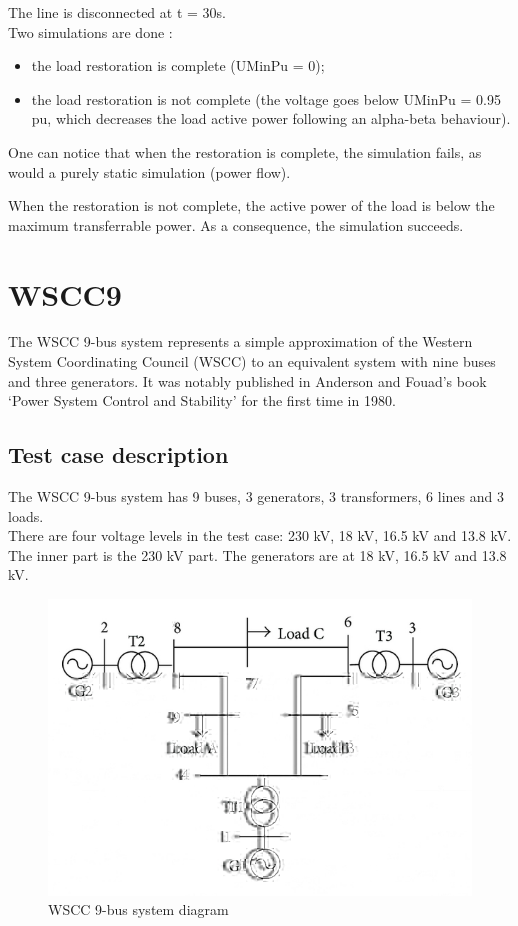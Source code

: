 \documentclass[a4paper, 12pt]{report}
\begin{document}
The line is disconnected at t = 30s.\\
Two simulations are done :
\begin{itemize}
\item the load restoration is complete (UMinPu = 0);
\item the load restoration is not complete (the voltage goes below UMinPu = 0.95 pu, which decreases the load active power following an alpha-beta behaviour).
\end{itemize}

One can notice that when the restoration is complete, the simulation fails, as would a purely static simulation (power flow).

When the restoration is not complete, the active power of the load is below the maximum transferrable power. As a consequence, the simulation succeeds.

\chapter{WSCC9}

The WSCC 9-bus system represents a simple approximation of the Western System Coordinating Council (WSCC) to an equivalent system with nine buses and three generators.
It was notably published in Anderson and Fouad’s book ‘Power System Control and Stability’ for the first time in 1980.

\section{Test case description}

The WSCC 9-bus system has 9 buses, 3 generators, 3 transformers, 6 lines and 3 loads.  \\
There are four voltage levels in the test case: 230 kV, 18 kV, 16.5 kV and 13.8 kV. The inner
part is the 230 kV part. The generators are at 18 kV, 16.5 kV and 13.8 kV.

\begin{figure}[H]
  \includegraphics[width=\textwidth]{WSCC9Bus.jpg}
  \caption{WSCC 9-bus system diagram}
\end{figure}
\end{document}
